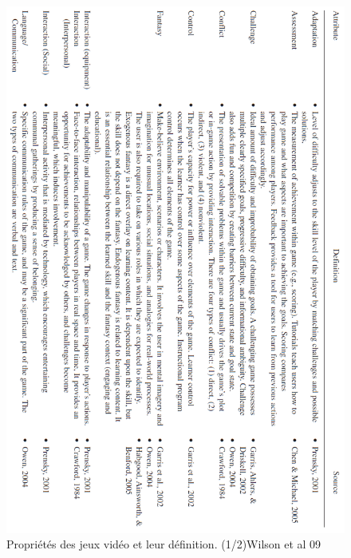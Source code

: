 \begin{figure}[htbp]
	\centering
	\includegraphics[width=\linewidth, height=\textheight ]{images/game_attributes_one}
	\caption{Propriétés des jeux vidéo et leur définition. (1/2)Wilson et al 09\cite{Wils09}}
	\label{game_attributes_one}
\end{figure}
